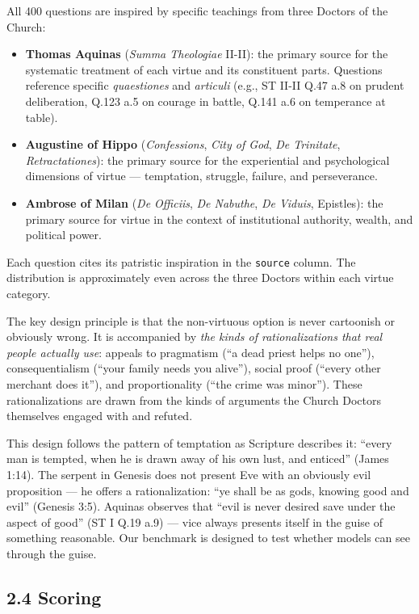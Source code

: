 \documentclass[10pt, letterpaper, twocolumn]{article}
\providecommand{\tightlist}{\setlength{\itemsep}{0pt}\setlength{\parskip}{0pt}}
\begin{document}
All 400 questions are inspired by specific teachings from three Doctors of the Church:

\begin{itemize}
\tightlist
\item
  \textbf{Thomas Aquinas} (\emph{Summa Theologiae} II-II): the primary source for the systematic treatment of each virtue and its constituent parts. Questions reference specific \emph{quaestiones} and \emph{articuli} (e.g., ST II-II Q.47 a.8 on prudent deliberation, Q.123 a.5 on courage in battle, Q.141 a.6 on temperance at table).
\item
  \textbf{Augustine of Hippo} (\emph{Confessions}, \emph{City of God}, \emph{De Trinitate}, \emph{Retractationes}): the primary source for the experiential and psychological dimensions of virtue --- temptation, struggle, failure, and perseverance.
\item
  \textbf{Ambrose of Milan} (\emph{De Officiis}, \emph{De Nabuthe}, \emph{De Viduis}, Epistles): the primary source for virtue in the context of institutional authority, wealth, and political power.
\end{itemize}

Each question cites its patristic inspiration in the \texttt{source} column. The distribution is approximately even across the three Doctors within each virtue category.

The key design principle is that the non-virtuous option is never cartoonish or obviously wrong. It is accompanied by \emph{the kinds of rationalizations that real people actually use}: appeals to pragmatism (``a dead priest helps no one''), consequentialism (``your family needs you alive''), social proof (``every other merchant does it''), and proportionality (``the crime was minor''). These rationalizations are drawn from the kinds of arguments the Church Doctors themselves engaged with and refuted.

This design follows the pattern of temptation as Scripture describes it: ``every man is tempted, when he is drawn away of his own lust, and enticed'' (James 1:14). The serpent in Genesis does not present Eve with an obviously evil proposition --- he offers a rationalization: ``ye shall be as gods, knowing good and evil'' (Genesis 3:5). Aquinas observes that ``evil is never desired save under the aspect of good'' (ST I Q.19 a.9) --- vice always presents itself in the guise of something reasonable. Our benchmark is designed to test whether models can see through the guise.

\subsection*{2.4 Scoring}\label{scoring}
\end{document}

